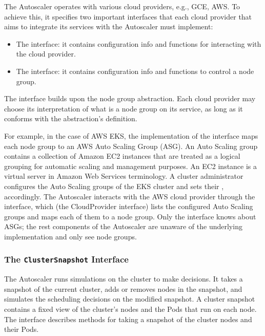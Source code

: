 The Autoscaler operates with various cloud providers, e.g., GCE, AWS. To achieve
this, it specifies two important interfaces that each cloud provider that aims
to integrate its services with the Autoscaler must implement:
\begin{itemize}
      \tightlist
      \item The  interface:  it contains configuration info
            and functions for interacting with the cloud provider.
      \item The  interface: it contains configuration info and
            functions to control a node group.
\end{itemize}

The  interface builds upon the node group abstraction. Each cloud
provider may choose its interpretation of what is a node group on its service,
as long as it conforms with the abstraction's definition.

For example, in the case of AWS EKS, the implementation of the 
interface maps each node group to an AWS Auto Scaling Group (ASG). An Auto
Scaling group contains a collection of Amazon EC2 instances that are treated as
a logical grouping for automatic scaling and management purposes. An EC2
instance is a virtual server in Amazon Web Services terminology. A cluster
administrator configures the Auto Scaling groups of the EKS cluster and sets
their ,  accordingly. The Autoscaler interacts with the
AWS cloud provider through the  interface, which (the
CloudProvider interface) lists the configured Auto Scaling groups and maps each
of them to a node group. Only the  interface knows about ASGs;
the rest components of the Autoscaler are unaware of the underlying
implementation and only see node groups.


\subsubsection{The \texttt{ClusterSnapshot} Interface}

The Autoscaler runs simulations on the cluster to make decisions. It takes a
snapshot of the current cluster, adds or removes nodes in the snapshot, and
simulates the scheduling decisions on the modified snapshot. A cluster snapshot
contains a fixed view of the cluster's nodes and the Pods that run on each node.
The  interface describes methods for taking a snapshot of
the cluster nodes and their Pods.

